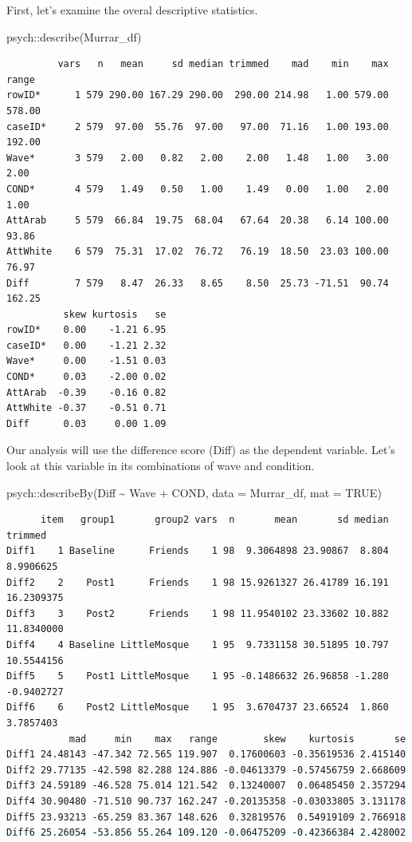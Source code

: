 \documentclass[
  11pt,
]{book}
\newenvironment{Shaded}{\begin{snugshade}}{\end{snugshade}}
\newcommand{\AttributeTok}[1]{\textcolor[rgb]{0.77,0.63,0.00}{#1}}
\newcommand{\ConstantTok}[1]{\textcolor[rgb]{0.00,0.00,0.00}{#1}}
\newcommand{\FunctionTok}[1]{\textcolor[rgb]{0.00,0.00,0.00}{#1}}
\newcommand{\NormalTok}[1]{#1}
\newcommand{\SpecialCharTok}[1]{\textcolor[rgb]{0.00,0.00,0.00}{#1}}
\begin{document}
First, let's examine the overal descriptive statistics.

\begin{Shaded}
\begin{Highlighting}[]
\NormalTok{psych}\SpecialCharTok{::}\FunctionTok{describe}\NormalTok{(Murrar\_df)}
\end{Highlighting}
\end{Shaded}

\begin{verbatim}
         vars   n   mean     sd median trimmed    mad    min    max  range
rowID*      1 579 290.00 167.29 290.00  290.00 214.98   1.00 579.00 578.00
caseID*     2 579  97.00  55.76  97.00   97.00  71.16   1.00 193.00 192.00
Wave*       3 579   2.00   0.82   2.00    2.00   1.48   1.00   3.00   2.00
COND*       4 579   1.49   0.50   1.00    1.49   0.00   1.00   2.00   1.00
AttArab     5 579  66.84  19.75  68.04   67.64  20.38   6.14 100.00  93.86
AttWhite    6 579  75.31  17.02  76.72   76.19  18.50  23.03 100.00  76.97
Diff        7 579   8.47  26.33   8.65    8.50  25.73 -71.51  90.74 162.25
          skew kurtosis   se
rowID*    0.00    -1.21 6.95
caseID*   0.00    -1.21 2.32
Wave*     0.00    -1.51 0.03
COND*     0.03    -2.00 0.02
AttArab  -0.39    -0.16 0.82
AttWhite -0.37    -0.51 0.71
Diff      0.03     0.00 1.09
\end{verbatim}

Our analysis will use the difference score (Diff) as the dependent variable. Let's look at this variable in its combinations of wave and condition.

\begin{Shaded}
\begin{Highlighting}[]
\NormalTok{psych}\SpecialCharTok{::}\FunctionTok{describeBy}\NormalTok{(Diff }\SpecialCharTok{\textasciitilde{}}\NormalTok{ Wave }\SpecialCharTok{+}\NormalTok{ COND, }\AttributeTok{data =}\NormalTok{ Murrar\_df, }\AttributeTok{mat =} \ConstantTok{TRUE}\NormalTok{)}
\end{Highlighting}
\end{Shaded}

\begin{verbatim}
      item   group1       group2 vars  n       mean       sd median    trimmed
Diff1    1 Baseline      Friends    1 98  9.3064898 23.90867  8.804  8.9906625
Diff2    2    Post1      Friends    1 98 15.9261327 26.41789 16.191 16.2309375
Diff3    3    Post2      Friends    1 98 11.9540102 23.33602 10.882 11.8340000
Diff4    4 Baseline LittleMosque    1 95  9.7331158 30.51895 10.797 10.5544156
Diff5    5    Post1 LittleMosque    1 95 -0.1486632 26.96858 -1.280 -0.9402727
Diff6    6    Post2 LittleMosque    1 95  3.6704737 23.66524  1.860  3.7857403
           mad     min    max   range        skew    kurtosis       se
Diff1 24.48143 -47.342 72.565 119.907  0.17600603 -0.35619536 2.415140
Diff2 29.77135 -42.598 82.288 124.886 -0.04613379 -0.57456759 2.668609
Diff3 24.59189 -46.528 75.014 121.542  0.13240007  0.06485450 2.357294
Diff4 30.90480 -71.510 90.737 162.247 -0.20135358 -0.03033805 3.131178
Diff5 23.93213 -65.259 83.367 148.626  0.32819576  0.54919109 2.766918
Diff6 25.26054 -53.856 55.264 109.120 -0.06475209 -0.42366384 2.428002
\end{verbatim}
\end{document}
